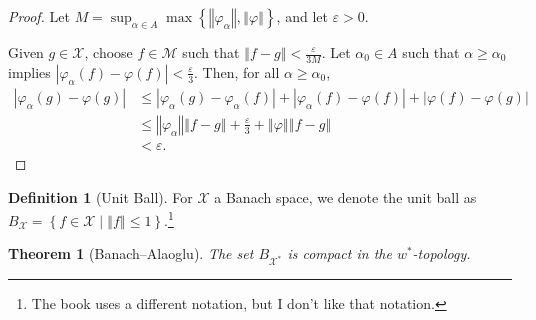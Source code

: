 \documentclass[12pt]{extarticle}
\newcommand{\norm}[1]{\left\Vert #1\right\Vert}
\newcommand{\set}[1]{\left\{#1\right\}}
\newcommand{\ve}{\varepsilon}
\theoremstyle{plain}
\newtheorem*{theorem}{Theorem}
\theoremstyle{definition}
\newtheorem*{definition}{Definition}
\theoremstyle{note}
\renewcommand{\newline}{\hfill\break}
\begin{document}
\begin{proof}
  Let $\displaystyle M = \sup_{\alpha \in A}\max\set{\norm{\varphi_{\alpha}},\norm{\varphi}}$, and let $\ve > 0$.\newline

  Given $g\in \mathcal{X}$, choose $f\in \mathcal{M}$ such that $\norm{f - g} < \frac{\ve}{3M}$. Let $\alpha_0\in A$ such that $\alpha \geq \alpha_0$  implies $\left\vert \varphi_{\alpha}(f) - \varphi(f) \right\vert < \frac{\ve}{3}$. Then, for all $\alpha \geq \alpha_0$,
  \begin{align*}
    \left\vert \varphi_{\alpha}(g) - \varphi(g) \right\vert &\leq \left\vert \varphi_{\alpha}(g) - \varphi_{\alpha}(f) \right\vert + \left\vert \varphi_{\alpha}(f) - \varphi(f) \right\vert + \left\vert \varphi(f) - \varphi(g) \right\vert\\
                                                            &\leq \norm{\varphi_{\alpha}}\norm{f-g} + \frac{\ve}{3} + \norm{\varphi}\norm{f-g}\\
                                                            &< \ve.
  \end{align*}
\end{proof}
\begin{definition}[Unit Ball]
  For $\mathcal{X}$ a Banach space, we denote the unit ball as $B_{\mathcal{X}} = \set{ f\in \mathcal{X}\mid \norm{f}\leq 1}$.\footnote{The book uses a different notation, but I don't like that notation.}
\end{definition}
\begin{theorem}[Banach--Alaoglu]
  The set $B_{\mathcal{X}^{\ast}}$ is compact in the $w^{\ast}$-topology.
\end{theorem}
\end{document}
